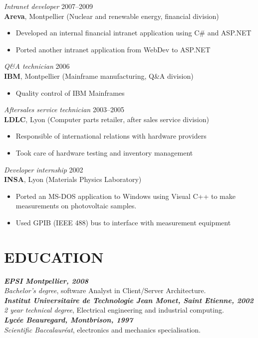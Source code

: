 \documentclass[line,resmargin]{res}
\begin{document}
\begin{resume}
{\sl Intranet developer\/} \hfill 2007--2009 \\
{\bf Areva}, Montpellier (Nuclear and renewable energy, financial division)
\begin{itemize} \itemsep -2pt
    \item Developed an internal financial intranet application using C\# and ASP.NET
    \item Ported another intranet application from WebDev to ASP.NET
\end{itemize}

{\sl Q\&A technician\/} \hfill 2006 \\
{\bf IBM}, Montpellier (Mainframe manufacturing, Q\&A division)
\begin{itemize}  \itemsep -2pt
    \item Quality control of IBM Mainframes
\end{itemize}

{\sl Aftersales service technician\/} \hfill     2003--2005 \\
{\bf LDLC}, Lyon (Computer parts retailer, after sales service division)
\begin{itemize}  \itemsep -2pt
    \item Responsible of international relations with hardware providers
    \item Took care of hardware testing and inventory management
\end{itemize}

{\sl Developer internship\/} \hfill 2002 \\
{\bf INSA}, Lyon (Materials Physics Laboratory)
\begin{itemize} \itemsep -2pt
    \item Ported an MS-DOS application to Windows using Visual C++ to make
    measurements on photovoltaic samples.
    \item Used GPIB (IEEE 488) bus to interface with measurement equipment
\end{itemize}

\section{EDUCATION}
{\sl \textbf{EPSI Montpellier, 2008}\\
Bachelor's degree}, software Analyst in Client/Server Architecture.\\
{\sl \textbf{Institut Universitaire de Technologie Jean Monet, Saint Etienne, 2002}\\
2 year technical degree}, Electrical engineering and  industrial computing.\\
{\sl \textbf{Lyc\'{e}e Beauregard, Montbrison, 1997} \\
Scientific Baccalaur\'{e}at}, electronics and mechanics specialisation.


\end{resume}
\end{document}

